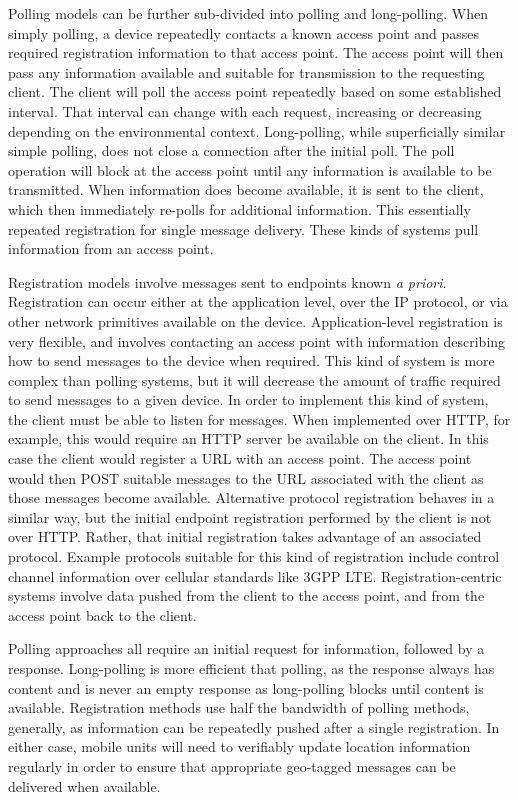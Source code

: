\documentclass{sbir}
\begin{document}
Polling models can be further sub-divided into polling and long-polling.  When simply polling, a device repeatedly contacts a known access point and passes required registration information to that access point.  The access point will then pass any information available and suitable for transmission to the requesting client.  The client will poll the access point repeatedly based on some established interval. That interval can change with each request, increasing or decreasing depending on the environmental context.   Long-polling, while superficially similar simple polling, does not close a connection after the initial poll.  The poll operation will block at the access point until any information is available to be transmitted.  When information does become available, it is sent to the client, which then immediately re-polls for additional information.  This essentially repeated registration for single message delivery.  These kinds of systems  pull information from an access point.

Registration models involve messages sent to endpoints known {\sl a priori}.  Registration can occur either at the application level, over the IP protocol, or via other network primitives available on the device.  Application-level registration is very flexible, and involves contacting an access point with information describing how to send messages to the device when required.  This kind of system is more complex than polling systems, but it will decrease the amount of traffic required to send messages to a given device.  In order to implement this kind of system, the client must be able to listen for messages. When implemented over HTTP, for example, this would require an HTTP server be available on the client.  In this case the client would register a URL with an access point.  The access point would then POST suitable messages to the URL associated with the client as those messages become available.  Alternative protocol registration behaves in a similar way, but the initial endpoint registration performed by the client is not over HTTP.  Rather, that initial registration takes advantage of an associated protocol.  Example protocols suitable for this kind of registration include control channel information over cellular standards like 3GPP LTE. Registration-centric systems involve data pushed from the client to the access point, and from the access point back to the client. 

Polling approaches all require an initial request for information, followed by a response.  Long-polling is more efficient that polling, as the response always has content and is never an empty response as long-polling blocks until content is available.  Registration methods use half the bandwidth of polling methods, generally, as information can be repeatedly pushed after a single registration.  In either case, mobile units will need to verifiably update location information regularly in order to ensure that appropriate geo-tagged messages can be delivered when available.
\end{document}
